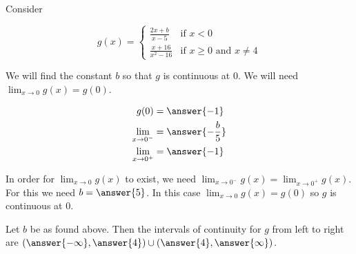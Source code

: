 \documentclass{ximera}
\author{Nela Lakos \and Kyle Parsons}
\begin{document}
\begin{exercise}

Consider

\[
g(x) = 
\begin{cases}
\frac{2x+b}{x-5} & \text{if }x<0\\
\frac{x+16}{x^2-16} & \text{if }x\geq0\text{ and }x\neq4
\end{cases}
\]

We will find the constant $b$ so that $g$ is continuous at 0.  We will need $\lim_{x\to0}g(x) = g(0)$.  

\begin{align*}
g(0) &= \answer{-1}\\
\lim_{x\to0^-} &= \answer{-\frac{b}{5}}\\
\lim_{x\to0^+} &= \answer{-1}
\end{align*}

\begin{exercise}

In order for $\lim_{x\to0}g(x)$ to exist, we need $\lim_{x\to0^-}g(x) = \lim_{x\to0^+}g(x)$. For this we need $b = \answer{5}$.  In this case $\lim_{x\to0}g(x) = g(0)$ so $g$ is continuous at 0.

\begin{exercise}

Let $b$ be as found above.  Then the intervals of continuity for $g$ from left to right are $\left(\answer{-\infty},\answer{4}\right)\cup\left(\answer{4},\answer{\infty}\right)$.

\end{exercise}
\end{exercise}
\end{exercise}
\end{document}
